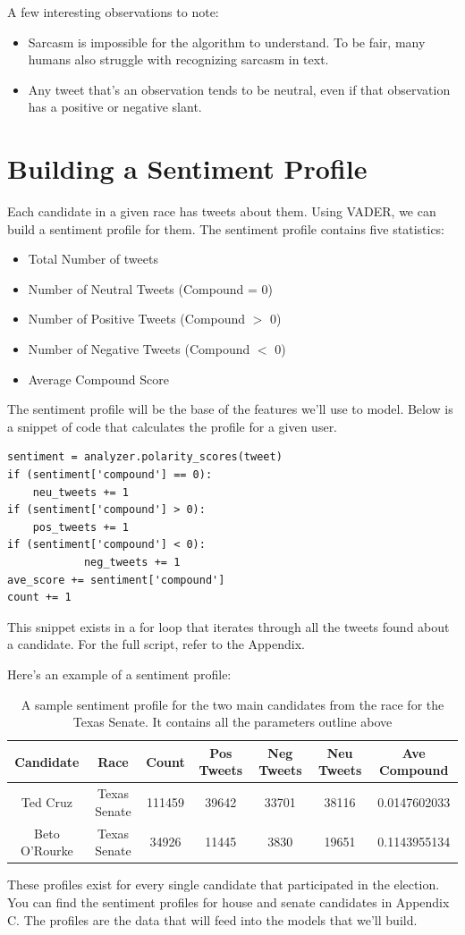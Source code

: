 \documentclass[11pt, twoside, reqno]{book}
\begin{document}
A few interesting observations to note:
\begin{itemize}
	\item Sarcasm is impossible for the algorithm to understand. To be fair, many humans also struggle with recognizing sarcasm in text.
	\item Any tweet that's an observation tends to be neutral, even if that observation has a positive or negative slant. 
\end{itemize}

\section{Building a Sentiment Profile}
Each candidate in a given race has tweets about them. Using VADER, we can build a sentiment profile for them. The sentiment profile contains five statistics:
\begin{itemize}
	\item Total Number of tweets
	\item Number of Neutral Tweets (Compound = 0)
	\item Number of Positive Tweets (Compound $>$ 0)
	\item Number of Negative Tweets (Compound $<$ 0)
	\item Average Compound Score
\end{itemize}
The sentiment profile will be the base of the features we'll use to model. Below is a snippet of code that calculates the profile for a given user.
\begin{verbatim}
sentiment = analyzer.polarity_scores(tweet) 
if (sentiment['compound'] == 0):        
	neu_tweets += 1          
if (sentiment['compound'] > 0):        
	pos_tweets += 1            
if (sentiment['compound'] < 0):
        	neg_tweets += 1
ave_score += sentiment['compound']
count += 1
\end{verbatim}
This snippet exists in a for loop that iterates through all the tweets found about a candidate. For the full script, refer to the Appendix. 

Here's an example of a sentiment profile:
\begin{table}[H]
\centering
\begin{tabular}{ |c|c|c|c|c|c|c|}
	\hline
	Candidate & Race & Count & Pos Tweets & Neg Tweets & Neu Tweets & Ave Compound\\
 	\hline 
	Ted Cruz & Texas Senate & 111459 & 39642 & 33701 & 38116 & 0.0147602033 \\
  	\hline
	Beto O'Rourke & Texas Senate & 34926 & 11445 & 3830 & 19651 & 0.1143955134 \\ 
	\hline
\end{tabular}
\caption{A sample sentiment profile for the two main candidates from the race for the Texas Senate. It contains all the parameters outline above}\label{fig:sample_profile}
\end{table}
These profiles exist for every single candidate that participated in the election. You can find the sentiment profiles for house and senate candidates in Appendix C. The profiles are the data that will feed into the models that we'll build. 
\end{document}
